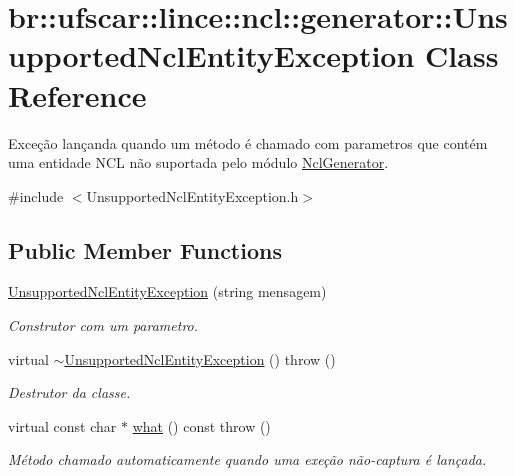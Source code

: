 \hypertarget{classbr_1_1ufscar_1_1lince_1_1ncl_1_1generator_1_1UnsupportedNclEntityException}{
\section{br::ufscar::lince::ncl::generator::UnsupportedNclEntityException Class Reference}
\label{classbr_1_1ufscar_1_1lince_1_1ncl_1_1generator_1_1UnsupportedNclEntityException}
}


Exceção lançanda quando um método é chamado com parametros que contém uma entidade NCL não suportada pelo módulo \hyperlink{classbr_1_1ufscar_1_1lince_1_1ncl_1_1generator_1_1NclGenerator}{NclGenerator}.  




{\ttfamily \#include $<$UnsupportedNclEntityException.h$>$}

\subsection*{Public Member Functions}
\begin{DoxyCompactItemize}
\item 
\hyperlink{classbr_1_1ufscar_1_1lince_1_1ncl_1_1generator_1_1UnsupportedNclEntityException_a4868659a2fc88948780f072bb330200b}{UnsupportedNclEntityException} (string mensagem)
\begin{DoxyCompactList}\small\item\em Construtor com um parametro. \item\end{DoxyCompactList}\item 
virtual \hyperlink{classbr_1_1ufscar_1_1lince_1_1ncl_1_1generator_1_1UnsupportedNclEntityException_a2be32ff1508c8af9d434090be4d62fe1}{$\sim$UnsupportedNclEntityException} ()  throw ()
\begin{DoxyCompactList}\small\item\em Destrutor da classe. \item\end{DoxyCompactList}\item 
virtual const char $\ast$ \hyperlink{classbr_1_1ufscar_1_1lince_1_1ncl_1_1generator_1_1UnsupportedNclEntityException_a45845d073dff3d90a08938a9058edc7e}{what} () const   throw ()
\begin{DoxyCompactList}\small\item\em Método chamado automaticamente quando uma exeção não-\/captura é lançada. \item\end{DoxyCompactList}\end{DoxyCompactItemize}



